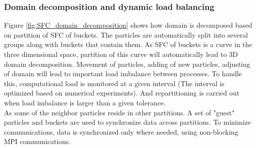 \documentclass[conference,compsoc]{IEEEtran}
\begin{document}
\subsubsection{Domain decomposition and dynamic load balancing}
Figure \ref{fig:SFC_domain_decomposition} shows how domain is decomposed based on partition of SFC of buckets. The particles are automatically split into several groups along with buckets that contain them. As SFC of buckets is a curve in the three dimensional space, partition of this curve will automatically lead to 3D domain decomposition. 
Movement of particles, adding of new particles, adjusting of domain will lead to important load imbalance between processes. To handle this, computational load is monitored at a given interval (The interval is optimized based on numerical experiments). And repartitioning is carried out when load imbalance is larger than a given tolerance.
\\
As some of the neighbor particles reside in other partitions. A set of "guest" particles and buckets are used to synchronize data across partitions. To minimize communications, data is synchronized only where needed, using non-blocking MPI communications. 
\end{document}
